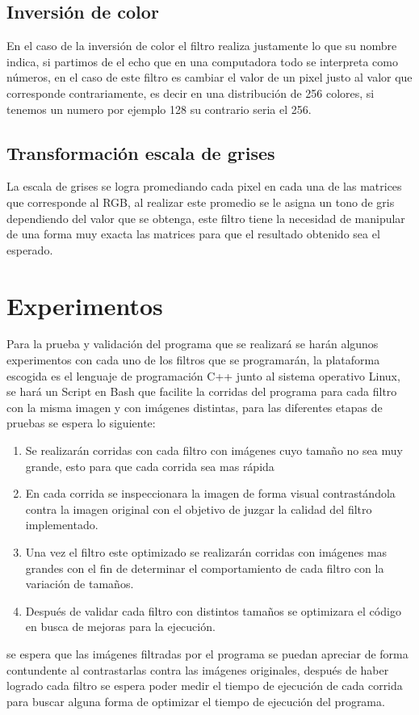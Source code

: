 \subsection{Inversión de color}
	En el caso de la inversión de color el filtro realiza justamente lo que su nombre indica, si partimos de el echo que en una computadora todo se interpreta
	como números, en el caso de este filtro es cambiar el valor de un pixel justo al valor que corresponde contrariamente, es decir en una distribución de 256
	colores, si tenemos un numero por ejemplo 128 su contrario seria el 256.
\subsection{Transformación escala de grises}
	La escala de grises se logra promediando cada pixel en cada una de las matrices que corresponde al RGB, al realizar este promedio se le asigna un tono
	de gris dependiendo del valor que se obtenga, este filtro tiene la necesidad de manipular de una forma muy exacta las matrices para que el resultado
	obtenido sea el esperado.
\newpage
\section{Experimentos}
	Para la prueba y validación del programa que se realizará se harán algunos experimentos con cada uno de los filtros que se programarán,
	la plataforma escogida es el lenguaje de programación C++ junto al sistema operativo Linux, se hará un Script en Bash que facilite la corridas 
	del programa para cada filtro con la misma imagen y con imágenes distintas, para las diferentes etapas de pruebas se espera lo siguiente:
	\begin{enumerate}
		\item Se realizarán corridas con cada filtro con imágenes cuyo tamaño no sea muy grande, esto para que cada corrida sea mas rápida
		\item En cada corrida se inspeccionara la imagen de forma visual contrastándola contra la imagen original con el objetivo de juzgar la 
				calidad del filtro implementado.
		\item Una vez el filtro este optimizado se realizarán corridas con imágenes mas grandes con el fin de determinar el comportamiento de cada filtro
				con la variación de tamaños.
		\item Después de validar cada filtro con distintos tamaños se optimizara el código en busca de mejoras para la ejecución.
	\end{enumerate} 
	se espera que las imágenes filtradas por el programa se puedan apreciar de forma contundente al contrastarlas contra las imágenes originales, 
	después de haber logrado cada filtro se espera poder medir el tiempo de ejecución de cada corrida para buscar alguna forma de optimizar 
	el tiempo de ejecución del programa. 
